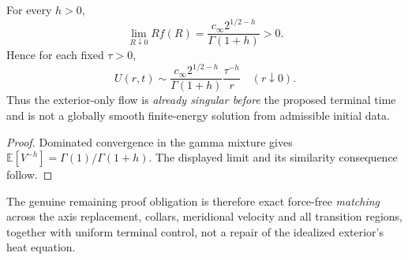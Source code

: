 \begin{proposition}
For every $h>0$,
\[
\lim_{R\downarrow0} R f(R)
=\frac{c_\infty 2^{1/2-h}}{\Gamma(1+h)}>0.
\]
Hence for each fixed $\tau>0$,
\[
U(r,t)\sim \frac{c_\infty 2^{1/2-h}}{\Gamma(1+h)}
\frac{\tau^{-h}}{r}\quad(r\downarrow0).
\]
Thus the exterior-only flow is \emph{already singular before}
the proposed terminal time and is not a globally smooth
finite-energy solution from admissible initial data.
\end{proposition}
\begin{proof}
Dominated convergence in the gamma mixture gives
$\mathbb E[V^{-h}]=\Gamma(1)/\Gamma(1+h)$.
The displayed limit and its similarity consequence follow.
\end{proof}
The genuine remaining proof obligation is therefore exact
force-free \emph{matching} across the axis replacement, collars,
meridional velocity and all transition regions, together with
uniform terminal control, not a repair of the idealized
exterior's heat equation.
